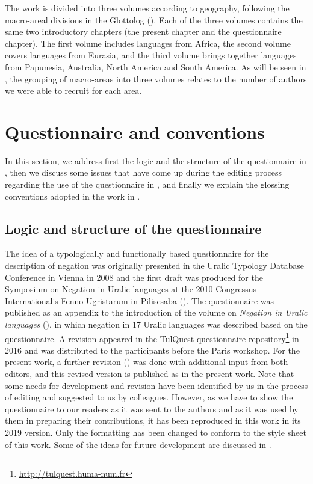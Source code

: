 \documentclass[output=paper,colorlinks,citecolor=brown]{langscibook}
\begin{document}
The work is divided into three volumes according to geography, following the macro-areal divisions in the Glottolog (\cite{Glottolog2024}). Each of the three volumes contains the same two introductory chapters (the present chapter and the questionnaire chapter). The first volume includes languages from Africa, the second volume covers languages from Eurasia, and the third volume brings together languages from Papunesia, Australia, North America and South America. As will be seen in , the grouping of macro-areas into three volumes relates to the number of authors we were able to recruit for each area. 

\section{Questionnaire and conventions}\label{section2:questionnaire}

In this section, we address first the logic and the structure of the questionnaire in , then we discuss some issues that have come up during the editing process regarding the use of the questionnaire in , and finally we explain the glossing conventions adopted in the work in .

\subsection{Logic and structure of the questionnaire}\label{subsec:intro:2.1.LogicQuestionnaire}

The idea of a typologically and functionally based questionnaire for the description of negation was originally presented in the Uralic Typology Database Conference in Vienna in 2008 and the first draft was produced for the Symposium on Negation in Uralic languages at the 2010 Congressus Internationalis Fenno-Ugristarum in Piliscsaba (\cite{MiestamoCIFU2010}).
The questionnaire was published as an appendix to the introduction of the volume on \textit{Negation in Uralic languages} (\cite{MiestamoEtAl2015}), in which negation in 17 Uralic languages was described based on the questionnaire. A revision appeared in the TulQuest questionnaire repository\footnote{\href{http://tulquest.huma-num.fr}{http://tulquest.huma-num.fr}} in 2016 and was distributed to the participants before the Paris workshop. For the present work, a further revision () was done with additional input from both editors, and this revised version is published as  in the present work. Note that some needs for development and revision have been identified by us in the process of editing and suggested to us by colleagues. However, as we have to show the questionnaire to our readers as it was sent to the authors and as it was used by them in preparing their contributions, it has been reproduced in this work in its 2019 version. Only the formatting has been changed to conform to the style sheet of this work. Some of the ideas for future development are discussed in .
\end{document}
